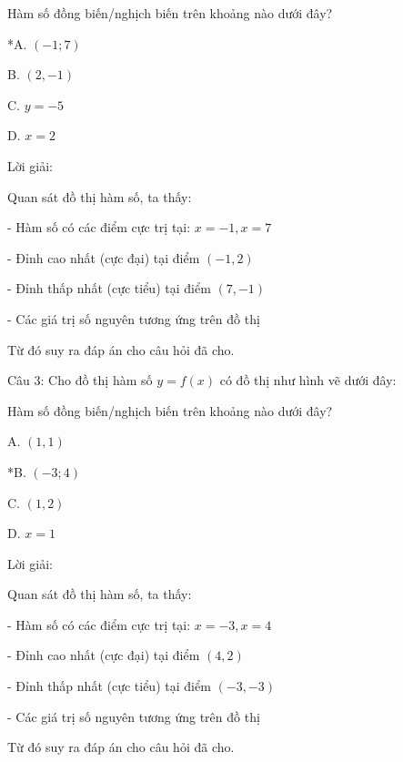 \documentclass[a4paper,12pt]{article}
\begin{document}
Hàm số đồng biến/nghịch biến trên khoảng nào dưới đây?

*A. \((-1;7)\)

B. \((2,-1)\)

C. \(y=-5\)

D. \(x=2\)

Lời giải:


            Quan sát đồ thị hàm số, ta thấy:

- Hàm số có các điểm cực trị tại: \(x = -1, x = 7\)

- Đỉnh cao nhất (cực đại) tại điểm \((-1, 2)\)

- Đỉnh thấp nhất (cực tiểu) tại điểm \((7, -1)\)

- Các giá trị số nguyên tương ứng trên đồ thị

Từ đó suy ra đáp án cho câu hỏi đã cho.




Câu 3: Cho đồ thị hàm số \(y=f(x)\) có đồ thị như hình vẽ dưới đây:




Hàm số đồng biến/nghịch biến trên khoảng nào dưới đây?

A. \((1,1)\)

*B. \((-3;4)\)

C. \((1,2)\)

D. \(x=1\)

Lời giải:


            Quan sát đồ thị hàm số, ta thấy:

- Hàm số có các điểm cực trị tại: \(x = -3, x = 4\)

- Đỉnh cao nhất (cực đại) tại điểm \((4, 2)\)

- Đỉnh thấp nhất (cực tiểu) tại điểm \((-3, -3)\)

- Các giá trị số nguyên tương ứng trên đồ thị

Từ đó suy ra đáp án cho câu hỏi đã cho.
\end{document}
